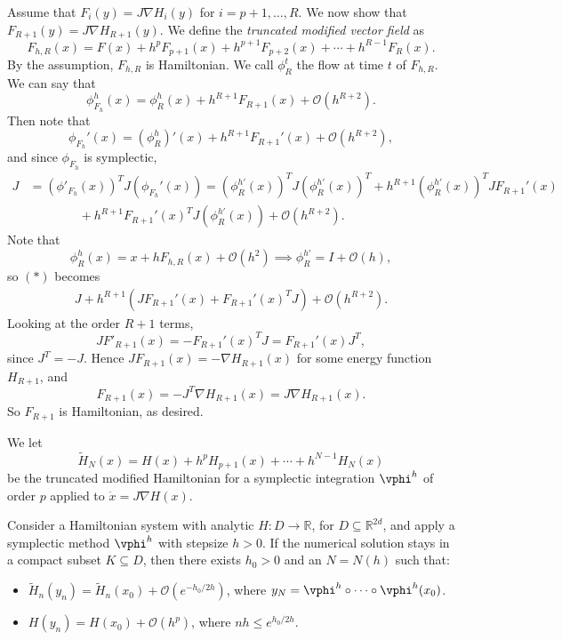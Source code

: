 \documentclass[12pt]{article}
\begin{document}

\begin{proofbox}
	Assume that $F_i(y) = J \nabla H_i(y)$ for $i = p+1, \ldots, R$. We now show that $F_{R+1}(y) = J \nabla H_{R + 1}(y)$. We define the \emph{truncated modified vector field} as
	\[
	F_{h, R}(x) = F(x) + h^{p} F_{p+1}(x) + h^{p+1} F_{p+2}(x) + \cdots + h^{R-1} F_R(x).
	\]
	By the assumption, $F_{h, R}$ is Hamiltonian. We call $\phi_R^{t}$ the flow at time $t$ of $F_{h, R}$. We can say that
	\[
	\phi_{F_h}^{h}(x) = \phi_{R}^{h}(x) + h^{R+1} F_{R+1}(x) + \mathcal{O}(h^{R+2}).
	\]
	Then note that
	\[
	\phi_{F_h}'(x) = (\phi_R^{h})'(x) + h^{R+1} F_{R+1}'(x) + \mathcal{O}(h^{R+2}),
	\]
	and since $\phi_{F_h}$ is symplectic,
	\begin{align*}
		J &= (\phi'_{F_h}(x))^{T} J (\phi_{F_h}'(x)) = (\phi_R^{h'}(x))^{T} J (\phi_{R}^{h'}(x))^{T} + h^{R+1} (\phi_R^{h'}(x))^{T} J F_{R+1}'(x) \\
		  & \qquad \qquad + h^{R+1} F_{R+1}'(x)^{T} J (\phi_R^{h'}(x)) + \mathcal{O}(h^{R+2}). \tag{$\ast$}
	\end{align*}
	Note that
	\[
	\phi_R^{h}(x) = x + h F_{h, R}(x) + \mathcal{O}(h^2) \implies \phi_R^{h'} = I + \mathcal{O}(h),
	\]
	so $(\ast)$ becomes
	\begin{align*}
		J + h^{R+1}( JF_{R+1}'(x) + F_{R+1}'(x)^{T} J) + \mathcal{O}(h^{R+2}).
	\end{align*}
	Looking at the order $R+1$ terms,
	\[
	J F'_{R+1}(x) = - F_{R+1}'(x)^{T} J = F_{R+1}'(x) J^{T},
	\]
	since $J^{T} = - J$. Hence $J F_{R+1}(x) = - \nabla H_{R+1}(x)$ for some energy function $H_{R+1}$, and
	\[
	F_{R+1}(x) = - J^{T} \nabla H_{R+1}(x) = J \nabla H_{R+1}(x).
	\]
	So $F_{R+1}$ is Hamiltonian, as desired.
\end{proofbox}

We let
\[
\tilde H_N(x) = H(x) + h^{p} H_{p+1}(x) + \cdots + h^{N-1}H_N(x)
\]
be the truncated modified Hamiltonian for a symplectic integration $\vphi^{h}$ of order $p$ applied to $\dot x = J \nabla H(x)$.

\begin{theorem}
	Consider a Hamiltonian system with analytic $H : D \to \mathbb{R}$, for $D \subseteq \mathbb{R}^{2d}$, and apply a symplectic method $\vphi^{h}$ with stepsize $h > 0$. If the numerical solution stays in a compact subset $K \subseteq D$, then there exists $h_0 > 0$ and an $N = N(h)$ such that:
	\begin{itemize}
		\item $\tilde H_n(y_n) = \tilde H_n(x_0) + \mathcal{O}(e^{-h_0/2h})$, where $y_N = \vphi^{h} \circ \cdots \circ \vphi^{h}(x_0)$.
		\item $H(y_n) = H(x_0) + \mathcal{O}(h^{p})$, where $n h \leq e^{h_0/2h}$.
	\end{itemize}
\end{theorem}
\end{document}
